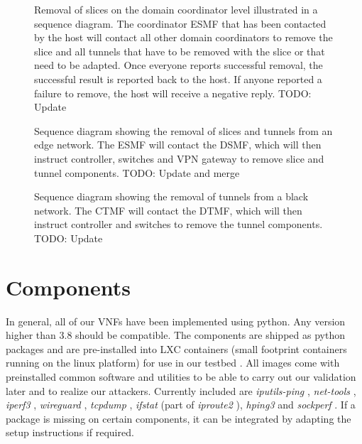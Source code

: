 \begin{figure}[hp]
  \centering
  
  \caption[Removal of slices on the domain coordinator level illustrated in a sequence diagram.]{Removal of slices on the domain coordinator level illustrated in a sequence diagram. The coordinator ESMF that has been contacted by the host will contact all other domain coordinators to remove the slice and all tunnels that have to be removed with the slice or that need to be adapted. Once everyone reports successful removal, the successful result is reported back to the host. If anyone reported a failure to remove, the host will receive a negative reply. TODO: Update}
  \label{fig:slice_removal_synchronization}
\end{figure}
\begin{figure}[hp]
  \centering
  
  \caption[Sequence diagram showing the removal of slices and tunnels from an edge network.]{Sequence diagram showing the removal of slices and tunnels from an edge network. The ESMF will contact the DSMF, which will then instruct controller, switches and VPN gateway to remove slice and tunnel components. TODO: Update and merge}
  \label{fig:slice_removal_edge}
\end{figure}
\begin{figure}[hp]
  \centering
  
  \caption[Sequence diagram showing the removal of tunnels from a black network.]{Sequence diagram showing the removal of tunnels from a black network. The CTMF will contact the DTMF, which will then instruct controller and switches to remove the tunnel components. TODO: Update}
  \label{fig:slice_removal_bn}
\end{figure}


\section{Components}
In general, all of our VNFs have been implemented using python. Any version higher than 3.8 should be compatible. The components are shipped as python packages and are pre-installed into LXC containers (small footprint containers running on the linux platform) \cite{lxc} for use in our testbed \cite{owntb}. All images come with preinstalled common software and utilities to be able to carry out our validation later and to realize our attackers. Currently included are \textit{iputils-ping} \cite{iputils}, \textit{net-tools} \cite{net-tools}, \textit{iperf3} \cite{iperf3}, \textit{wireguard} \cite{wireguard}, \textit{tcpdump} \cite{tcpdump}, \textit{ifstat} (part of \textit{iproute2} \cite{iproute2}), \textit{hping3} \cite{hping3} and \textit{sockperf} \cite{sockperf}. If a package is missing on certain components, it can be integrated by adapting the setup instructions if required.

